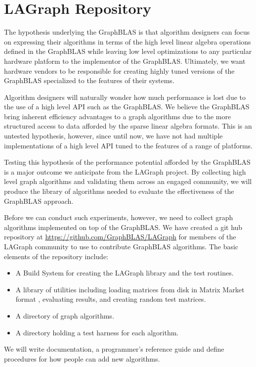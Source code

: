 \section{LAGraph Repository}
\label{sec:repo}

The hypothesis underlying the GraphBLAS is that algorithm designers can focus on expressing their algorithms
in terms of the high level linear algebra operations defined in the GraphBLAS while leaving low level
optimizations to any particular hardware platform to the implementor of the GraphBLAS.  Ultimately, 
we want hardware vendors to be responsible for creating highly tuned versions of the GraphBLAS
specialized to the features of their systems.

Algorithm designers will naturally wonder how much performance is lost due to the use of a high 
level API such as the GraphBLAS.  We believe the GraphBLAS bring inherent efficiency advantages to 
a graph algorithms due to the more structured access to data afforded by the sparse linear algebra 
formats.  This is an untested hypothesis, however, since until now, we have not had multiple 
implementations of a high level API tuned to the features of a range of platforms.

Testing this hypothesis of the performance potential afforded by the GraphBLAS is a major outcome
we anticipate from the LAGraph project.  By collecting high level graph algorithms and validating them
across an engaged community, we will produce the library of algorithms needed to evaluate the 
effectiveness of the GraphBLAS approach.

Before we can conduct such experiments, however, we need to collect graph algorithms implemented on 
top of the GraphBLAS. We have created a git hub repository at
\url{https://github.com/GraphBLAS/LAGraph} for members of the LAGraph community to 
use to contribute GraphBLAS algorithms. The basic elements of the repository include:
\begin{itemize}
\item A Build System for creating the LAGraph library and the test routines.
\item A library of utilities including loading matrices from disk in Matrix Market format \cite{MM},
    evaluating results, and creating random test matrices.
\item A directory of graph algorithms.
\item A directory holding a test harness for each algorithm.
\end{itemize}

We will write documentation, a programmer's reference guide and define procedures for how people
can add new algorithms.  
